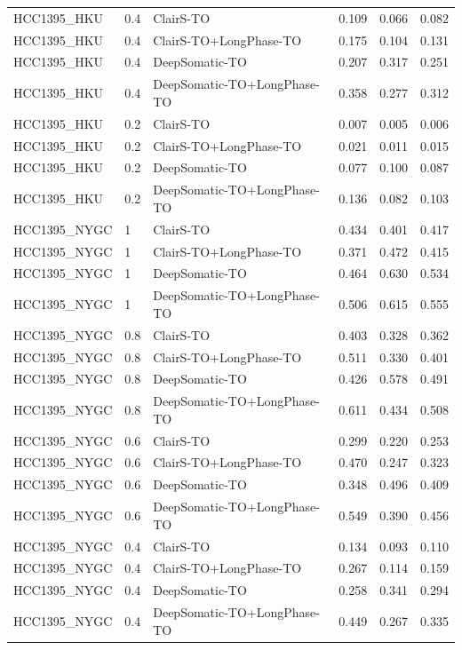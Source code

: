 \documentclass[pdflatex,sn-nature]{sn-jnl}
\begin{document}
{\begin{longtable}{@{}lllccc@{}}
  HCC1395\_HKU & 0.4 & ClairS-TO & 0.109 & 0.066 & 0.082 \\
  HCC1395\_HKU & 0.4 & ClairS-TO+LongPhase-TO & 0.175 & 0.104 & 0.131 \\
  HCC1395\_HKU & 0.4 & DeepSomatic-TO & 0.207 & 0.317 & 0.251 \\
  HCC1395\_HKU & 0.4 & DeepSomatic-TO+LongPhase-TO & 0.358 & 0.277 & 0.312 \\
  HCC1395\_HKU & 0.2 & ClairS-TO & 0.007 & 0.005 & 0.006 \\
  HCC1395\_HKU & 0.2 & ClairS-TO+LongPhase-TO & 0.021 & 0.011 & 0.015 \\
  HCC1395\_HKU & 0.2 & DeepSomatic-TO & 0.077 & 0.100 & 0.087 \\
  HCC1395\_HKU & 0.2 & DeepSomatic-TO+LongPhase-TO & 0.136 & 0.082 & 0.103 \\
  HCC1395\_NYGC & 1 & ClairS-TO & 0.434 & 0.401 & 0.417 \\
  HCC1395\_NYGC & 1 & ClairS-TO+LongPhase-TO & 0.371 & 0.472 & 0.415 \\
  HCC1395\_NYGC & 1 & DeepSomatic-TO & 0.464 & 0.630 & 0.534 \\
  HCC1395\_NYGC & 1 & DeepSomatic-TO+LongPhase-TO & 0.506 & 0.615 & 0.555 \\
  HCC1395\_NYGC & 0.8 & ClairS-TO & 0.403 & 0.328 & 0.362 \\
  HCC1395\_NYGC & 0.8 & ClairS-TO+LongPhase-TO & 0.511 & 0.330 & 0.401 \\
  HCC1395\_NYGC & 0.8 & DeepSomatic-TO & 0.426 & 0.578 & 0.491 \\
  HCC1395\_NYGC & 0.8 & DeepSomatic-TO+LongPhase-TO & 0.611 & 0.434 & 0.508 \\
  HCC1395\_NYGC & 0.6 & ClairS-TO & 0.299 & 0.220 & 0.253 \\
  HCC1395\_NYGC & 0.6 & ClairS-TO+LongPhase-TO & 0.470 & 0.247 & 0.323 \\
  HCC1395\_NYGC & 0.6 & DeepSomatic-TO & 0.348 & 0.496 & 0.409 \\
  HCC1395\_NYGC & 0.6 & DeepSomatic-TO+LongPhase-TO & 0.549 & 0.390 & 0.456 \\
  HCC1395\_NYGC & 0.4 & ClairS-TO & 0.134 & 0.093 & 0.110 \\
  HCC1395\_NYGC & 0.4 & ClairS-TO+LongPhase-TO & 0.267 & 0.114 & 0.159 \\
  HCC1395\_NYGC & 0.4 & DeepSomatic-TO & 0.258 & 0.341 & 0.294 \\
  HCC1395\_NYGC & 0.4 & DeepSomatic-TO+LongPhase-TO & 0.449 & 0.267 & 0.335 \\

\end{longtable}}
\end{document}
